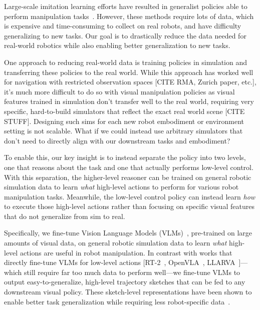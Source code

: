 Large-scale imitation learning efforts have resulted in generalist policies able to perform manipulation tasks~\citep{robomimic2021,ravichandar2020recent}. However, these methods require lots of data, which is expensive and time-consuming to collect on real robots, and have difficulty generalizing to new tasks.
Our goal is to drastically reduce the data needed for real-world robotics while also enabling better generalization to new tasks.


One approach to reducing real-world data is training policies in simulation and transferring these policies to the real world. 
While this approach has worked well for navigation with restricted observation spaces [CITE RMA, Zurich paper, etc.], it's much more difficult to do so with visual manipulation policies as visual features trained in simulation don't transfer well to the real world, requiring very specific, hard-to-build simulators that reflect the exact real world scene [CITE STUFF]. Designing such sims for each new robot embodiment or environment setting is not scalable.
What if we could instead use arbitrary simulators that don't need to directly align with our downstream tasks and embodiment?

To enable this, our key insight is to instead separate the policy into two levels, one that reasons about the task and one that actually performs low-level control. With this separation, the higher-level reasoner can be trained on general robotic simulation data to learn \emph{what} high-level actions to perform for various robot manipulation tasks. Meanwhile, the low-level control policy can instead learn \emph{how} to execute those high-level actions rather than focusing on specific visual features that do not generalize from sim to real.

Specifically, we fine-tune Vision Language Models (VLMs)~\citep{bommasani2021opportunities}, pre-trained on large amounts of visual data, on general robotic simulation data to learn \emph{what} high-level actions are useful in robot manipulation. In contrast with works that directly fine-tune VLMs for low-level actions [RT-2~\citep{brohan2022rt,zitkovich2023rt}, OpenVLA~\citep{kim2024openvla}, LLARVA~\citep{niu2024llarva}]---which still require far too much data to perform well---we fine-tune VLMs to output easy-to-generalize, high-level trajectory sketches that can be fed to any downstream visual policy. These sketch-level representations have been shown to enable better task generalization while requiring less robot-specific data~\citep{gu2023rttrajectory}.

